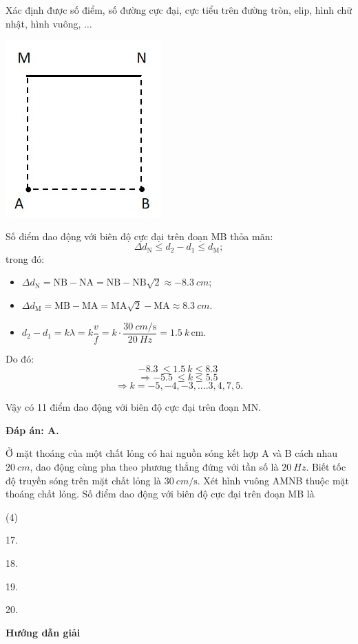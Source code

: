 \begin{dang}{Xác định được số điểm, số đường cực đại, cực tiểu trên đường tròn, elip, hình chữ nhật, hình vuông, $\ldots$}
{\begin{center}
			\vspace*{1em}
			\includegraphics[scale=0.8]{../figs/VN12-PH-11-A-007-1-V2-3.jpg}
		\end{center}
		Số điểm dao động với biên độ cực đại trên đoạn MB thỏa mãn:
		$$\Delta d_\text{N}\leq {d_2}-{d_1}\leq d_\text{M};$$
		trong đó:
		\begin{itemize}
			\item
			$ \Delta d_\text{N}=\text{NB}-\text{NA}=\text{NB}-\text{NB}\sqrt{2}\approx-\SI{8.3}{cm}$;
			\item
			$ \Delta d_\text{M}=\text{MB}-\text{MA}=\text{MA}\sqrt{2}-\text{MA}\approx\SI{8.3}{cm}$.
			\item
			$d_2-d_1=k\lambda=k\dfrac{v}{f}=k\cdot\dfrac{\SI{30}{cm/\second}}{\SI{20}{Hz}}=\SI{1.5}{}k\,\text{cm}$.
		\end{itemize}
		
		Do đó:
		$$ -\SI{8.3}{}\le \SI{1.5}{}k\le \SI{8.3}{}$$ $$\Rightarrow -\SI{5.5}{}\le k\le \SI{5.5}{}$$  $$\Rightarrow k= -5,-4,-3,....3,4,7,5.$$
		
		Vậy có 11 điểm dao động với biên độ cực đại trên đoạn MN.
		
		\textbf{Đáp án: A.}
	}
	{Ở mặt thoáng của một chất lỏng có hai nguồn sóng kết hợp A và B cách nhau $\SI{20}{cm}$, dao động cùng pha theo phương thẳng đứng với tần số là $\SI{20}{Hz}$. Biết tốc độ truyền sóng trên mặt chất lỏng là $\SI{30}{cm/\second}$. Xét hình vuông AMNB thuộc mặt thoáng chất lỏng. Số điểm dao động với biên độ cực đại trên đoạn MB là
		\begin{mcq}(4)
			\item 17.
			\item 18.
			\item 19.
			\item 20.
	\end{mcq}}
	{\begin{center}
			\textbf{Hướng dẫn giải}
			

\end{center}}
\end{dang}
